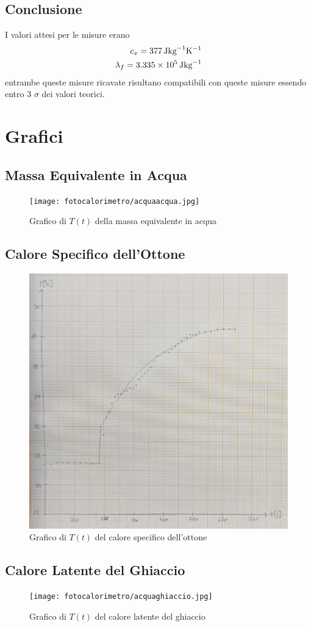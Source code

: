 \documentclass[a4paper]{article}
\begin{document}
\subsection{Conclusione} 
I valori attesi per le misure erano 
\begin{align}
    c_x = \SI{377}{Jkg^{-1}K^{-1}}\\
    \lambda_f = \SI{3.335E5}{Jkg^{-1}}
\end{align}
entrambe queste misure ricavate risultano compatibili con queste misure essendo entro 3 $\sigma$ dei valori teorici.  

\newpage
\section{Grafici}
\subsection{Massa Equivalente in Acqua}
\begin{figure}[!ht]
    \centering
    \texttt{[image: fotocalorimetro/acquaacqua.jpg]}
    \caption{Grafico di $T(t)$ della massa equivalente in acqua}
\end{figure}
\FloatBarrier

\newpage
\subsection{Calore Specifico dell'Ottone}
\begin{figure}[!ht]
    \centering
    \includegraphics[width=\textwidth]{fotocalorimetro/acquaoggetto.jpg}
    \caption{Grafico di $T(t)$ del calore specifico dell'ottone }
\end{figure}
\FloatBarrier

\newpage
\subsection{Calore Latente del Ghiaccio}
\begin{figure}[!ht]
    \centering
    \texttt{[image: fotocalorimetro/acquaghiaccio.jpg]}
    \caption{Grafico di $T(t)$ del calore latente del ghiaccio}
\end{figure}
\end{document}
